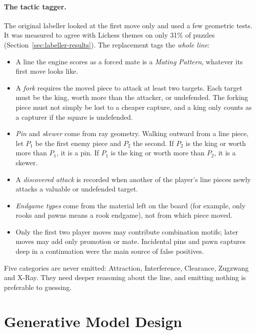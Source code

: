 \paragraph{The tactic tagger.} The original labeller looked at the first move only and used a few
geometric tests. It was measured to agree with Lichess themes on only 31\% of puzzles
(Section~\ref{sec:labeller-results}). The replacement tags the \emph{whole line}:
\begin{itemize}
  \item A line the engine scores as a forced mate is a \emph{Mating Pattern}, whatever its first move
        looks like.
  \item A \emph{fork} requires the moved piece to attack at least two targets. Each target must be
        the king, worth more than the attacker, or undefended. The forking piece must not simply be
        lost to a cheaper capture, and a king only counts as a capturer if the square is undefended.
  \item \emph{Pin} and \emph{skewer} come from ray geometry. Walking outward from a line piece, let
        $P_1$ be the first enemy piece and $P_2$ the second. If $P_2$ is the king or worth more than
        $P_1$, it is a pin. If $P_1$ is the king or worth more than $P_2$, it is a skewer.
  \item A \emph{discovered attack} is recorded when another of the player's line pieces newly attacks
        a valuable or undefended target.
  \item \emph{Endgame types} come from the material left on the board (for example, only rooks and
        pawns means a rook endgame), not from which piece moved.
  \item Only the first two player moves may contribute combination motifs; later moves may add only
        promotion or mate. Incidental pins and pawn captures deep in a continuation were the main
        source of false positives.
\end{itemize}
Five categories are never emitted: Attraction, Interference, Clearance, Zugzwang and X-Ray. They need
deeper reasoning about the line, and emitting nothing is preferable to guessing.



\section{Generative Model Design}\label{sec:generation}

